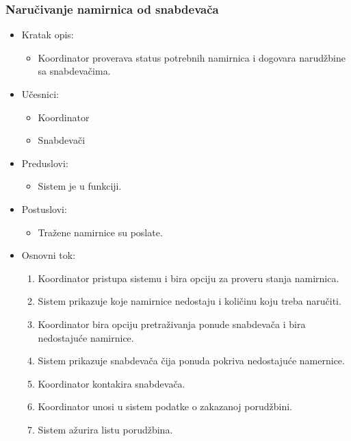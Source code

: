 

\subsubsection{Naručivanje namirnica od snabdevača}


\begin{itemize}
	\item Kratak opis:
		\begin{itemize}
			\item Koordinator proverava status potrebnih namirnica i dogovara narudžbine sa snabdevačima.
		\end{itemize}
	\item Učesnici:
		\begin{itemize}
		    \item Koordinator
		    \item Snabdevači
		\end{itemize}
	\item Preduslovi:
		\begin{itemize}
		   
		    \item Sistem je u funkciji.
		\end{itemize}
	\item Postuslovi:
		\begin{itemize}
			\item Tražene namirnice su poslate.
	\end{itemize}
	\item Osnovni tok:
		\begin{enumerate}
            \item Koordinator pristupa sistemu i bira opciju za proveru stanja namirnica.
           \item Sistem prikazuje koje namirnice nedostaju i količinu koju treba naručiti.
           \item Koordinator bira opciju pretraživanja ponude snabdevača i bira nedostajuće namirnice.
            \item Sistem prikazuje snabdevača čija ponuda pokriva nedostajuće namernice. 
             \item  Koordinator kontakira snabdevača.
             \item Koordinator unosi u sistem podatke o zakazanoj  porudžbini.
            \item Sistem ažurira listu porudžbina. 
            

\end{enumerate}
\end{itemize}
